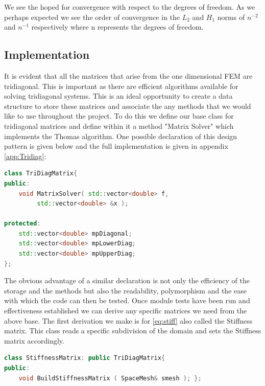 \documentclass{uonmathreport}
\theoremstyle{definition}
\theoremstyle{problem}
\theoremstyle{theorem}
\begin{document}
\vspace{6mm}

We see the hoped for convergence with respect to the degrees of freedom. As we perhaps expected we see the order of convergence in the $L_2$ and $H_1$ norms of $n^{-2}$ and $n^{-1}$ respectively where n represents the degrees of freedom. 

\subsection{Implementation} \label{subsec:Implementation1}

It is evident that all the matrices that arise from the one dimensional FEM are tridiagonal. This is important as there are efficient algorithms available for solving tridiagonal systems. This is an ideal opportunity to create a data structure to store these matrices and associate the any methods that we would like to use throughout the project. To do this we define our base class for tridiagonal matrices and define within it a method "Matrix Solver" which implements the Thomas algorithm. One possible declaration of this design pattern is given below and the full implementation is given in appendix \ref{app:Tridiag}:

\begin{lstlisting}[language=C++]
class TriDiagMatrix{
public:
    void MatrixSolver( std::vector<double> f,
         std::vector<double> &x );

protected:
    std::vector<double> mpDiagonal;
    std::vector<double> mpLowerDiag;
    std::vector<double> mpUpperDiag;
};
\end{lstlisting}



The obvious advantage of a similar declaration is not only the efficiency of the storage and the methods but also the readability, polymorphism and the ease with which the code can then be tested. Once module tests have been run and effectiveness established we can derive any specific matrices we need from the above base. The first derivation we make is for \ref{eq:stiff} also called the Stiffness matrix. This class reads a specific subdivision of the domain and sets the Stiffness matrix accordingly.

\begin{lstlisting}[language=C++]
class StiffnessMatrix: public TriDiagMatrix{
public:
    void BuildStiffnessMatrix ( SpaceMesh& smesh ); };

\end{lstlisting}
\end{document}

